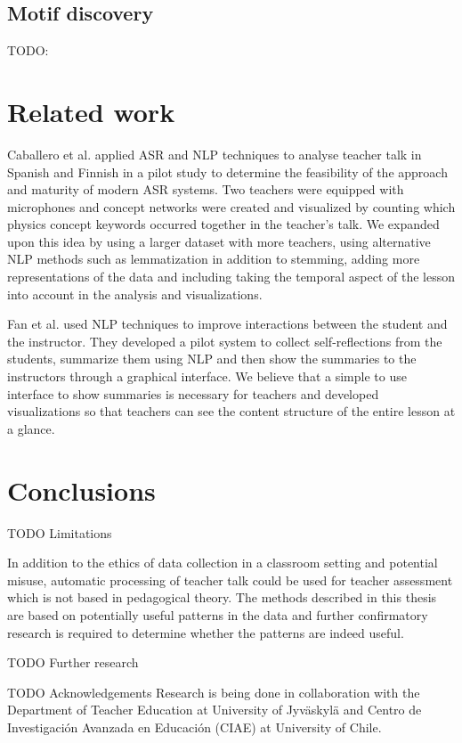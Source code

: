 \documentclass[utf8,english]{gradu3}
\begin{document}
\section{Motif discovery}

TODO:
\chapter{Related work}

Caballero et al. \parencite*{caballeroASRClassroomToday2017} applied ASR and NLP techniques to analyse teacher talk in Spanish and Finnish in a pilot study to determine the feasibility of the approach and maturity of modern ASR systems. Two teachers were equipped with microphones and concept networks were created and visualized by counting which physics concept keywords occurred together in the teacher's talk. We expanded upon this idea by using a larger dataset with more teachers, using alternative NLP methods such as lemmatization in addition to stemming, adding more representations of the data and including taking the temporal aspect of the lesson into account in the analysis and visualizations.

Fan et al. \parencite*{fanCourseMIRROREnhancingLarge2015} used NLP techniques to improve interactions between the student and the instructor. They developed a pilot system to collect self-reflections from the students, summarize them using NLP and then show the summaries to the instructors through a graphical interface. We believe that a simple to use interface to show summaries is necessary for teachers and developed visualizations so that teachers can see the content structure of the entire lesson at a glance.



\chapter{Conclusions}



TODO Limitations

In addition to the ethics of data collection in a classroom setting and potential misuse, automatic processing of teacher talk could be used for teacher assessment which is not based in pedagogical theory. The methods described in this thesis are based on potentially useful patterns in the data and further confirmatory research is required to determine whether the patterns are indeed useful.

TODO Further research

TODO Acknowledgements
Research is being done in collaboration with the Department of Teacher Education at University of Jyväskylä and Centro de Investigación Avanzada en Educación (CIAE) at University of Chile.
 
\printbibliography
\end{document}
